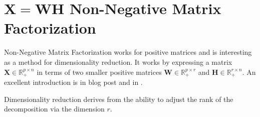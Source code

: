 \section{$\mathbf{X}=\mathbf{W}\mathbf{H}$ Non-Negative Matrix Factorization}

Non-Negative Matrix Factorization works for positive matrices and is interesting as a method for dimensionality reduction. It works by expressing a matrix $\mathbf{X}\in\mathbb{R}^{p\times n}_+$ in terms of two smaller positive matrices $\mathbf{W}\in\mathbb{R}_+^{p\times r}$ and $\mathbf{H}\in \mathbb{R}^{r\times n}_+$. An excellent introduction is in  blog post and in . 

Dimensionality reduction derives from the ability to adjust the rank of the decomposition via the dimension $r$.

